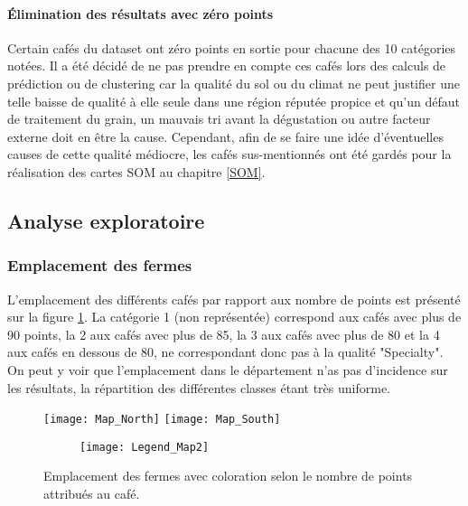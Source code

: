 \paragraph{Élimination des résultats avec zéro points} Certain cafés du dataset ont zéro points en sortie pour chacune des 10 catégories notées. Il a été décidé de ne pas prendre en compte ces cafés lors des calculs de prédiction ou de clustering car la qualité du sol ou du climat ne peut justifier une telle baisse de qualité à elle seule dans une région réputée propice et qu'un défaut de traitement du grain, un mauvais tri avant la dégustation ou autre facteur externe doit en être la cause. Cependant, afin de se faire une idée d'éventuelles causes de cette qualité médiocre, les cafés sus-mentionnés ont été gardés pour la réalisation des cartes SOM au chapitre \ref{SOM}. 





\subsection{Analyse exploratoire}


\subsubsection{Emplacement des fermes}\label{EmpFermes} L'emplacement des différents cafés par rapport aux nombre de points est présenté sur la figure \ref{FincaVSPoints}. La catégorie 1 (non représentée) correspond aux cafés avec plus de 90 points, la 2 aux cafés avec plus de 85, la 3 aux cafés avec plus de 80 et la 4 aux cafés en dessous de 80, ne correspondant donc pas à la qualité "Specialty". On peut y voir que l'emplacement dans le département n'as pas d'incidence sur les résultats, la répartition des différentes classes étant très uniforme. 


\begin{figure}[H]
	\texttt{[image: Map\_North]}
	\newline
	\newline
	\newline
	\texttt{[image: Map\_South]}
	
	\begin{figure}[H]
		\texttt{[image: Legend\_Map2]}
	\end{figure}
	\caption{\label{FincaVSPoints} Emplacement des fermes avec coloration selon le nombre de points attribués au café.}
\end{figure}


